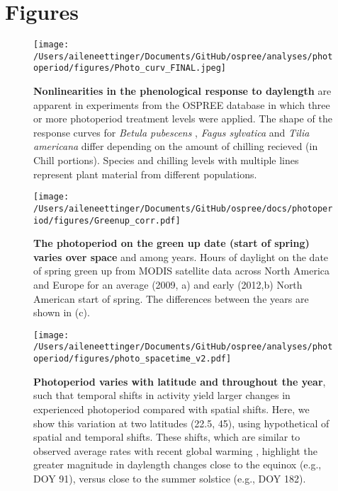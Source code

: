 \documentclass{article}
\begin{document}
\section* {Figures}
\begin{figure}[p]
\texttt{[image: /Users/aileneettinger/Documents/GitHub/ospree/analyses/photoperiod/figures/Photo\_curv\_FINAL.jpeg]} 
\caption{\textbf{Nonlinearities in the phenological response to daylength} are apparent in experiments from the OSPREE database in which three or more photoperiod treatment levels were applied. The shape of the response curves for \textit{Betula pubescens} \citep{Caffarra:2011b}, \textit{Fagus sylvatica} \citep{Heide:1993a} and \textit{Tilia americana} \citep{Ashby:1962aa} differ depending on the amount of chilling recieved (in Chill portions). Species and chilling levels with multiple lines represent plant material from different populations.}

 \label{fig:photocurve}
 \end{figure}

\begin{figure}[p]
\centering
\texttt{[image: /Users/aileneettinger/Documents/GitHub/ospree/docs/photoperiod/figures/Greenup\_corr.pdf]} %
\caption{\textbf{The photoperiod on the green up date (start of spring) varies over space} and among years. Hours of daylight on the date of spring green up from MODIS satellite data across North America and Europe for an average (2009, a) and  early (2012,b) North American start of spring. The differences between the years are shown in (c). }
 \label{fig:greenup}%
 \end{figure}


\begin{figure}[p]
\centering
\texttt{[image: /Users/aileneettinger/Documents/GitHub/ospree/analyses/photoperiod/figures/photo\_spacetime\_v2.pdf]} %
\caption{\textbf{Photoperiod varies with latitude and throughout the year}, such that temporal shifts in activity yield larger changes in experienced photoperiod compared with spatial shifts. Here, we show this variation at two latitudes (22.5\degree, 45\degree), using hypothetical of spatial and temporal shifts. These shifts, which are similar to observed average rates with recent global warming \citep[e.g.,][]{parmesan2006,chen2011}, highlight the greater magnitude in daylength changes close to the equinox (e.g., DOY 91), versus close to the summer solstice (e.g., DOY 182).}
 \label{fig:spacetime}%
 \end{figure}
 
\end{document}
